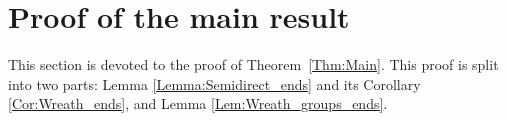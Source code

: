 %
%
%
%
%
%
%
%
%
%
\section{Proof of the main result}
\label{Section:Proof}
%
%
%
%
%
This section is devoted to the proof of Theorem~\ref{Thm:Main}. This proof is split into two parts: Lemma \ref{Lemma:Semidirect_ends} and its Corollary \ref{Cor:Wreath_ends}, and Lemma \ref{Lem:Wreath_groups_ends}.



